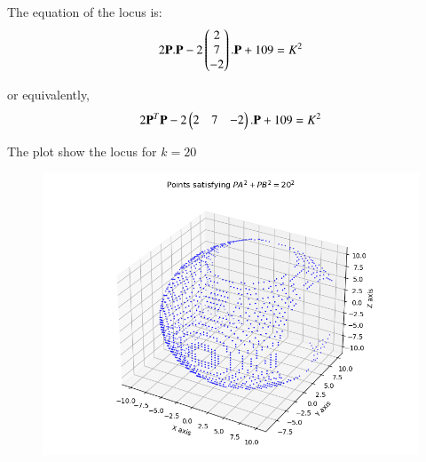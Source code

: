 \documentclass[journal]{IEEEtran}
\begin{document}
The equation of the locus is:
\begin{align}
    2\mathbf{P}.\mathbf{P}-2\begin{pmatrix}2 \\ 7 \\ -2\end{pmatrix}.\mathbf{P}+109=K^2
\end{align}

or equivalently,
\begin{align}
    2\mathbf{P}^T\mathbf{P}-2\begin{pmatrix}2 & 7 & -2\end{pmatrix}.\mathbf{P}+109=K^2
\end{align}

\newpage
The plot show the locus for $k=20$

\begin{figure}[H]
    \centering
    \includegraphics[width=1\columnwidth]{figs/plot2_1.png}
    \caption{}
    \label{fig:plot}
\end{figure}
\end{document}
